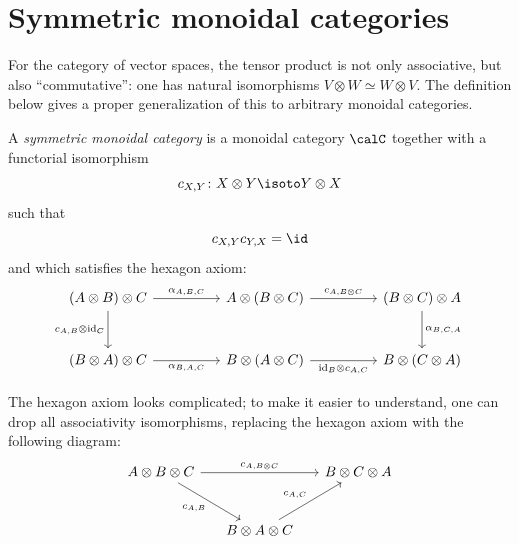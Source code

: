 \section{Symmetric monoidal categories}\label{s:symmetric-monoidal}
For the category of vector spaces, the tensor product is not only associative,
but also ``commutative'': one has natural isomorphisms $V\otimes W \simeq
W\otimes V$. The definition below gives a proper generalization of this to
arbitrary monoidal categories.

\begin{definition}\label{d:symmetric}
  A \emph{symmetric monoidal category} is a monoidal category $\calC$ together
  with a functorial isomorphism
  $$
    c_{X,Y}\colon X\otimes Y \isoto Y\otimes X
  $$
  such that
  $$
  c_{X,Y} c_{Y,X}=\id
  $$
  and which satisfies the hexagon axiom:
  \begin{equation}\label{e:hexagon1}
    \begin{tikzcd}[column sep=huge, row sep=large]
      (A\otimes B)\otimes C
      \arrow[r,"\alpha_{A,B,C}"]
      \arrow[d,"c_{A,B}\otimes \mathrm{id}_C"']
      & A\otimes(B\otimes C)
      \arrow[r,"c_{A,B\otimes C}"]
      & (B\otimes C)\otimes A
      \arrow[d,"\alpha_{B,C,A}"] \\
      (B\otimes A)\otimes C
      \arrow[r,"\alpha_{B,A,C}"']
      & B\otimes(A\otimes C)
      \arrow[r,"\mathrm{id}_B\otimes c_{A,C}"']
      & B\otimes(C\otimes A)
    \end{tikzcd}
  \end{equation}
\end{definition}
The hexagon axiom looks complicated; to make it easier to understand, one
can drop all associativity isomorphisms, replacing the hexagon axiom with the
following diagram:
\begin{equation}\label{e:hexagon3}
  \begin{tikzcd}[column sep=5mm, row sep=large]
    A\otimes B\otimes C
    \arrow[rr,"c_{A, B\otimes C}"]
    \arrow[dr,"c_{A,B}"']
    && B\otimes C\otimes A\\
    & B\otimes A\otimes C
    \arrow[ur,"c_{A,C}"]  &
  \end{tikzcd}
\end{equation}

